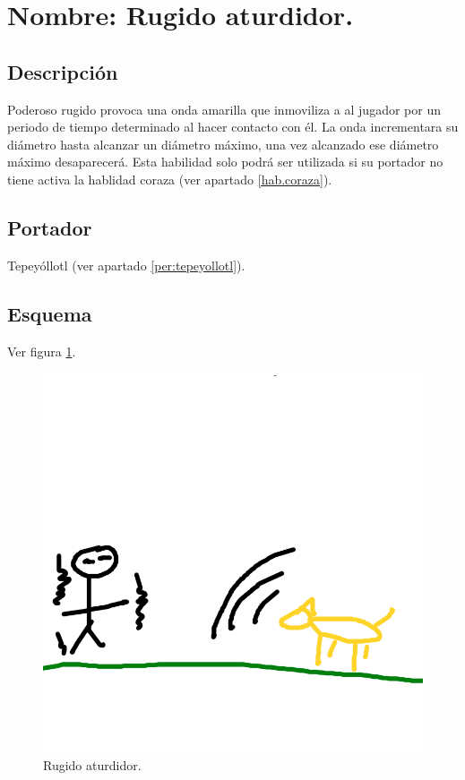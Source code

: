 \section{Nombre: Rugido aturdidor.}\label{hab.RugAtur}
\subsection{Descripción}
Poderoso rugido provoca una onda amarilla que inmoviliza a al jugador por un periodo de tiempo determinado al hacer contacto con él. La onda incrementara su diámetro hasta alcanzar un diámetro máximo, una vez alcanzado ese diámetro máximo desaparecerá. Esta habilidad solo podrá ser utilizada si su portador no tiene activa la hablidad coraza (ver apartado \ref{hab.coraza}).
\subsection{Portador}
Tepeyóllotl (ver apartado \ref{per:tepeyollotl}). 
\subsection{Esquema}
			Ver figura \ref{fig:rugido}.
			\begin{figure}
				\centering
				\includegraphics[height=0.2 \textheight]{Imagenes/rugido}
				\caption{Rugido aturdidor.}
				\label{fig:rugido}
			\end{figure}